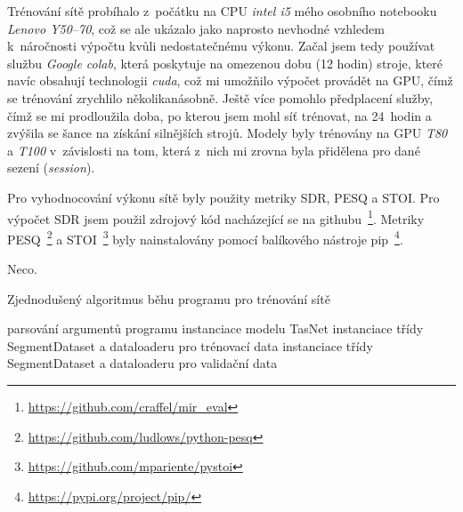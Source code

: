 Trénování sítě probíhalo z~počátku na CPU \textit{intel i5} mého osobního notebooku \textit{Lenovo Y50--70}, což se ale ukázalo jako naprosto nevhodné vzhledem k~náročnosti výpočtu kvůli nedostatečnému výkonu. Začal jsem tedy používat službu \textit{Google colab}, která poskytuje na omezenou dobu (12 hodin) stroje, které navíc obsahují technologii \textit{cuda}, což mi umožňilo výpočet provádět na GPU, čímž se trénování zrychlilo několikanásobně. Ještě více pomohlo předplacení služby, čímž se mi prodloužila doba, po kterou jsem mohl síť trénovat, na 24~hodin a zvýšila se šance na získání silnějších strojů. Modely byly trénovány na GPU \textit{T80} a \textit{T100} v~závislosti na tom, která z~nich mi zrovna byla přidělena pro dané sezení (\textit{session}). 

Pro vyhodnocování výkonu sítě byly použity metriky SDR, PESQ a STOI. Pro výpočet SDR jsem použil zdrojový kód nacházející se na githubu~\footnote{\url{https://github.com/craffel/mir_eval}}. Metriky PESQ~\footnote{\url{https://github.com/ludlows/python-pesq}} a STOI~\footnote{\url{https://github.com/mpariente/pystoi}} byly nainstalovány pomocí balíkového nástroje pip~\footnote{\url{https://pypi.org/project/pip/}}.

\bigskip

Neco.

\begin{algorithm}[H]
\caption{\label{alg:zakladnibeh}Zjednodušený algoritmus běhu programu pro trénování sítě}
\SetNoFillComment
 
 parsování argumentů programu\;
 instanciace modelu TasNet\;
 instanciace třídy SegmentDataset a dataloaderu pro trénovací data\;
 instanciace třídy SegmentDataset a dataloaderu pro validační data\;

\end{algorithm}


